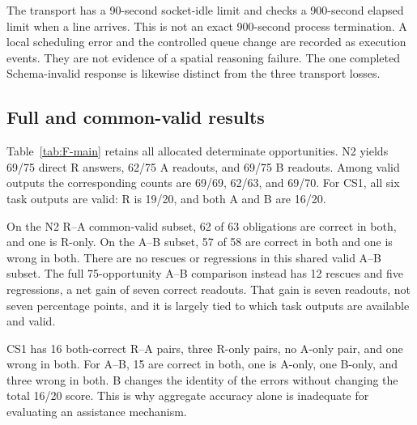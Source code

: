 The transport has a 90-second socket-idle limit and checks a 900-second elapsed limit when a line arrives. This is not an exact 900-second process termination. A local scheduling error and the controlled queue change are recorded as execution events. They are not evidence of a spatial reasoning failure. The one completed Schema-invalid response is likewise distinct from the three transport losses.

\subsection{Full and common-valid results}
Table~\ref{tab:F-main} retains all allocated determinate opportunities. N2 yields 69/75 direct R answers, 62/75 A readouts, and 69/75 B readouts. Among valid outputs the corresponding counts are 69/69, 62/63, and 69/70. For CS1, all six task outputs are valid: R is 19/20, and both A and B are 16/20.

\begin{table}[htbp]\centering

\caption{Qwen full-denominator results under evaluator 2.2.1. The four invalid or absent task outputs are retained. CS1 has no such exclusion.}\label{tab:F-main}
\end{table}

\begin{table}[htbp]\centering\small

\caption{Qwen common-valid query pairs. These isolate shared valid outputs and should be read alongside the allocated denominator.}\label{tab:F-paired}
\end{table}

On the N2 R--A common-valid subset, 62 of 63 obligations are correct in both, and one is R-only. On the A--B subset, 57 of 58 are correct in both and one is wrong in both. There are no rescues or regressions in this shared valid A--B subset. The full 75-opportunity A--B comparison instead has 12 rescues and five regressions, a net gain of seven correct readouts. That gain is seven readouts, not seven percentage points, and it is largely tied to which task outputs are available and valid.

CS1 has 16 both-correct R--A pairs, three R-only pairs, no A-only pair, and one wrong in both. For A--B, 15 are correct in both, one is A-only, one B-only, and three wrong in both. B changes the identity of the errors without changing the total 16/20 score. This is why aggregate accuracy alone is inadequate for evaluating an assistance mechanism.

